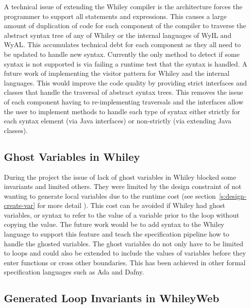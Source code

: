 A technical issue of extending the Whiley compiler is the architecture forces
the programmer to support all statements and expressions.
This causes a large amount of duplication of code for each component of the
compiler to traverse the abstract syntax tree of any of Whiley or the internal
languages of WyIL and WyAL.
This accumulates technical debt for each component as they all need to be
updated to handle new syntax.
Currently the only method to detect if some syntax is not supported is via 
failing a runtime test that the syntax is handled.
A future work of implementing the visitor pattern for Whiley and the internal
languages.
This would improve the code quality by providing strict interfaces and
classes that handle the traversal of abstract syntax trees.
This removes the issue of each component having to re-implementing traversals
and the interfaces allow the user to implement methods to handle each type of
syntax either strictly for each syntax element (via Java interfaces) or
non-strictly (via extending Java classes).

\subsection{Ghost Variables in Whiley}

During the project the issue of lack of ghost variables in Whiley blocked some
invariants and limited others.
They were limited by the design constraint of not wanting to generate local
variables due to the runtime cost (see section~\ref{s:design-create-var} for
more detail ).
This cost can be avoided if Whiley had ghost variables, or syntax to refer to
the value of a variable prior to the loop without copying the value.
The future work would be to add syntax to the Whiley language to support this
feature and teach the specification pipeline how to handle the ghosted
variables.
The ghost variables do not only have to be limited to loops and could also be 
extended to include the values of variables before they enter functions or
cross other boundaries.
This has been achieved in other formal specification languages such as Ada and
Dafny.

\subsection{Generated Loop Invariants in WhileyWeb}

